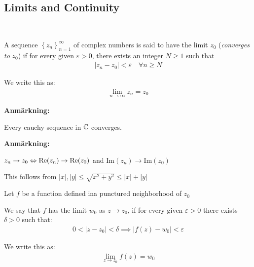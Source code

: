 \subsection{Limits and Continuity}\hfill\\
\par\bigskip
\begin{theo}{}
  A sequence $\left\{z_n\right\}_{n=1}^\infty$ of complex numbers is said to have the limit $z_0$ (\textit{converges to} $z_0$) if for every given $\varepsilon>0$, there exists an integer $N\geq1$  such that
  \begin{equation*}
    \begin{gathered}
      \left|z_n-z_0\right|<\varepsilon\quad \forall n\geq N
    \end{gathered}
  \end{equation*}
  \par\bigskip
  \noindent We write this as:
  \begin{equation*}
    \begin{gathered}
      \lim_{n\to\infty}z_n = z_0
    \end{gathered}
  \end{equation*}
\end{theo}
\par\bigskip
\noindent\textbf{Anmärkning:}\par
\noindent Every cauchy sequence in $\mathbb{C}$ converges. 
\par\bigskip
\noindent\textbf{Anmärkning:}\par
\noindent $z_n\to z_0\Leftrightarrow \text{Re}(z_n)\to\text{Re}(z_0)$ and Im$(z_n)\to\text{Im}(z_0)$\par
\noindent This follows from $\left|x\right|, \left|y\right|\leq\sqrt{x^2+y^2}\leq\left|x\right|+\left|y\right|$ 
\par\bigskip
\begin{theo}[]{}
  Let $f$ be a function defined ina  punctured neighborhood of $z_0$
  \par\bigskip
  \noindent We say that $f$ has the limit $w_0$ as $z\to z_0$, if for every given $\varepsilon>0$ there exists $\delta>0$ such that:
  \begin{equation*}
    \begin{gathered}
      0<\left|z-z_0\right|<\delta\implies \left|f(z)-w_0\right|<\varepsilon
    \end{gathered}
  \end{equation*}
  \par\bigskip
  \noindent We write this as:
  \begin{equation*}
    \begin{gathered}
      \lim_{z\to z_0}f(z) = w_0
    \end{gathered}
  \end{equation*}
\end{theo}
